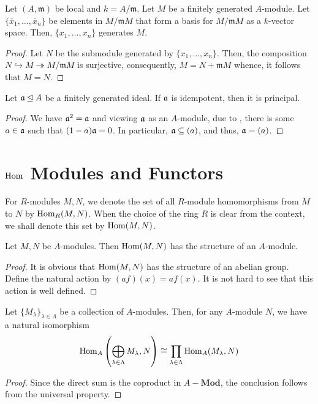 \begin{lemma}
    Let $(A,\mathfrak m)$ be local and $k = A/\mathfrak m$. Let $M$ be a finitely generated $A$-module. Let $\{\overline x_1,\ldots,\overline x_n\}$ be elements in $M/\mathfrak mM$ that form a basis for $M/\mathfrak mM$ as a $k$-vector space. Then, $\{x_1,\ldots,x_n\}$ generates $M$.
\end{lemma}
\begin{proof}
    Let $N$ be the submodule generated by $\{x_1,\ldots,x_n\}$. Then, the composition $N\hookrightarrow M\twoheadrightarrow M/\mathfrak mM$ is surjective, consequently, $M = N + \mathfrak mM$ whence, it follows that $M = N$.
\end{proof}

\begin{proposition}
    Let $\mathfrak a\unlhd A$ be a finitely generated ideal. If $\mathfrak a$ is idempotent, then it is principal.
\end{proposition}
\begin{proof}
    We have $\mathfrak a^2 = \mathfrak a$ and viewing $\mathfrak a$ as an $A$-module, due to , there is some $a\in\mathfrak a$ such that $(1 - a)\mathfrak a = 0$. In particular, $\mathfrak a\subseteq(a)$, and thus, $\mathfrak a = (a)$.
\end{proof}

\section{\texorpdfstring{$\operatorname{Hom}$}{} Modules and Functors}

For $R$-modules $M,N$, we denote the set of all $R$-module homomorphisms from $M$ to $N$ by $\operatorname{Hom}_R(M,N)$. When the choice of the ring $R$ is clear from the context, we shall denote this set by $\operatorname{Hom}(M,N)$.

\begin{proposition}
    Let $M,N$ be $A$-modules. Then $\operatorname{Hom}(M,N)$ has the structure of an $A$-module.
\end{proposition}
\begin{proof}
    It is obvious that $\operatorname{Hom}(M,N)$ has the structure of an abelian group. Define the natural action by $(af)(x) = af(x)$. It is not hard to see that this action is well defined.
\end{proof}

\begin{proposition}
    Let $\{M_\lambda\}_{\lambda\in\Lambda}$ be a collection of $A$-modules. Then, for any $A$-module $N$, we have a natural isomorphism
    \begin{equation*}
        \operatorname{Hom}_A\left(\bigoplus_{\lambda\in\Lambda}M_\lambda, N\right)\cong\prod_{\lambda\in\Lambda}\operatorname{Hom}_A(M_\lambda,N)
    \end{equation*}
\end{proposition}
\begin{proof}
    Since the direct sum is the coproduct in $A-\mathbf{Mod}$, the conclusion follows from the universal property.
\end{proof}

